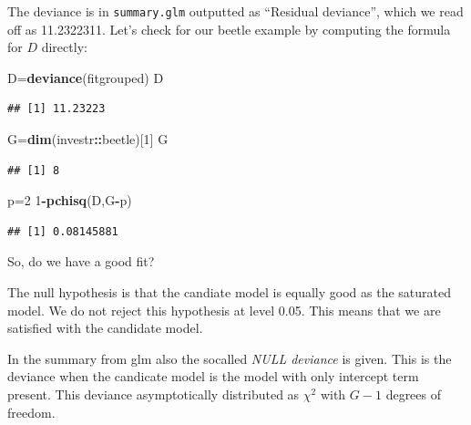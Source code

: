 \documentclass[
  ignorenonframetext,
]{beamer}
\newenvironment{Shaded}{\begin{snugshade}}{\end{snugshade}}
\newcommand{\DecValTok}[1]{\textcolor[rgb]{0.00,0.00,0.81}{#1}}
\newcommand{\FunctionTok}[1]{\textcolor[rgb]{0.13,0.29,0.53}{\textbf{#1}}}
\newcommand{\NormalTok}[1]{#1}
\newcommand{\OtherTok}[1]{\textcolor[rgb]{0.56,0.35,0.01}{#1}}
\newcommand{\SpecialCharTok}[1]{\textcolor[rgb]{0.81,0.36,0.00}{\textbf{#1}}}
\begin{document}
\begin{frame}[fragile]
The deviance is in \texttt{summary.glm} outputted as ``Residual
deviance'', which we read off as 11.2322311. Let's check for our beetle
example by computing the formula for \(D\) directly:

\begin{Shaded}
\begin{Highlighting}[]
\NormalTok{D}\OtherTok{=}\FunctionTok{deviance}\NormalTok{(fitgrouped)}
\NormalTok{D}
\end{Highlighting}
\end{Shaded}

\begin{verbatim}
## [1] 11.23223
\end{verbatim}

\begin{Shaded}
\begin{Highlighting}[]
\NormalTok{G}\OtherTok{=}\FunctionTok{dim}\NormalTok{(investr}\SpecialCharTok{::}\NormalTok{beetle)[}\DecValTok{1}\NormalTok{]}
\NormalTok{G}
\end{Highlighting}
\end{Shaded}

\begin{verbatim}
## [1] 8
\end{verbatim}

\begin{Shaded}
\begin{Highlighting}[]
\NormalTok{p}\OtherTok{=}\DecValTok{2}
\DecValTok{1}\SpecialCharTok{{-}}\FunctionTok{pchisq}\NormalTok{(D,G}\SpecialCharTok{{-}}\NormalTok{p)}
\end{Highlighting}
\end{Shaded}

\begin{verbatim}
## [1] 0.08145881
\end{verbatim}

So, do we have a good fit?
\end{frame}

\begin{frame}
The null hypothesis is that the candiate model is equally good as the
saturated model. We do not reject this hypothesis at level 0.05. This
means that we are satisfied with the candidate model.

In the summary from glm also the socalled \emph{NULL deviance} is given.
This is the deviance when the candicate model is the model with only
intercept term present. This deviance asymptotically distributed as
\(\chi^2\) with \(G-1\) degrees of freedom.
\end{frame}
\end{document}
